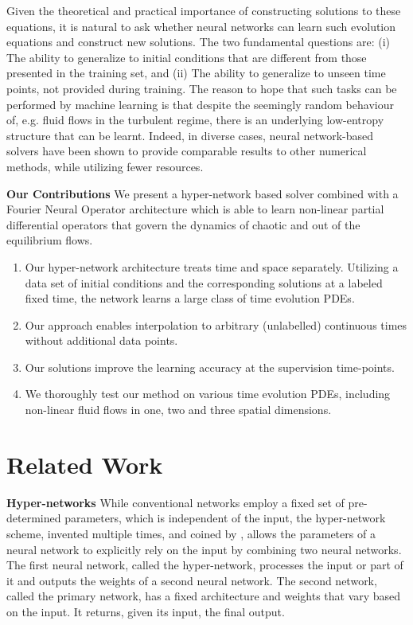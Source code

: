 \documentclass{article}
\theoremstyle{plain}
\theoremstyle{definition}
\theoremstyle{remark}
\begin{document}
Given the theoretical and practical importance of constructing solutions to these
equations, it is natural to ask whether neural networks can learn such evolution
equations and construct new solutions.  The two fundamental questions are: (i) The ability to generalize to initial conditions that are different from those presented in the training set, and (ii) The ability to generalize to unseen time points, not provided during training.
The reason to hope that such tasks can be performed by machine learning is that despite 
the seemingly random behaviour of, e.g. fluid flows in the turbulent regime, there is an underlying
low-entropy structure that can be learnt.
 Indeed, in diverse cases, neural network-based solvers have been shown to provide comparable results to other numerical methods, while utilizing fewer resources.



{\bf Our Contributions\quad} We present a hyper-network based solver combined with
a Fourier Neural Operator architecture which is able to learn non-linear partial differential operators 
that govern the dynamics of chaotic and out of the equilibrium flows. 
\begin{enumerate}
\item 
Our hyper-network architecture treats time and space separately. Utilizing a data set of initial conditions and the corresponding solutions at a labeled fixed time,
the network learns a large class of time evolution PDEs. 
\item Our approach enables interpolation to arbitrary (unlabelled) continuous times without additional data points.
\item Our solutions improve the learning accuracy at the supervision time-points.
\item We thoroughly test our method on various time evolution PDEs, including non-linear fluid flows in one, two and three spatial dimensions.
\end{enumerate}


\section{Related Work}

{\bf Hyper-networks \quad}
While conventional networks employ a fixed set of pre-determined parameters, which is independent of the input, the hyper-network scheme, invented multiple times, and coined by \citet{DBLP:conf/iclr/HaDL17}, allows the parameters of a neural network to explicitly rely on the input by combining two neural networks. The first neural network, called the hyper-network, processes the input or part of it and outputs the weights of a second neural network. The second network, called the primary network, has a fixed architecture and weights that vary based on the input. It returns, given its input, the final output. 
\end{document}
